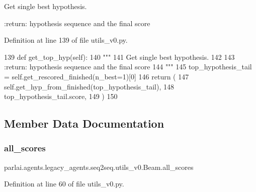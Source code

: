 \begin{DoxyVerb}Get single best hypothesis.

:return: hypothesis sequence and the final score
\end{DoxyVerb}
 

Definition at line 139 of file utils\+\_\+v0.\+py.


\begin{DoxyCode}
139     \textcolor{keyword}{def }get\_top\_hyp(self):
140         \textcolor{stringliteral}{"""}
141 \textcolor{stringliteral}{        Get single best hypothesis.}
142 \textcolor{stringliteral}{}
143 \textcolor{stringliteral}{        :return: hypothesis sequence and the final score}
144 \textcolor{stringliteral}{        """}
145         top\_hypothesis\_tail = self.get\_rescored\_finished(n\_best=1)[0]
146         \textcolor{keywordflow}{return} (
147             self.get\_hyp\_from\_finished(top\_hypothesis\_tail),
148             top\_hypothesis\_tail.score,
149         )
150 
\end{DoxyCode}


\subsection{Member Data Documentation}
\mbox{\label{classparlai_1_1agents_1_1legacy__agents_1_1seq2seq_1_1utils__v0_1_1Beam_ae8e9fc9a712aef34dc78d40faf089d79}} 
\subsubsection{\texorpdfstring{all\+\_\+scores}{all\_scores}}
{\footnotesize\ttfamily parlai.\+agents.\+legacy\+\_\+agents.\+seq2seq.\+utils\+\_\+v0.\+Beam.\+all\+\_\+scores}



Definition at line 60 of file utils\+\_\+v0.\+py.

\mbox{\label{classparlai_1_1agents_1_1legacy__agents_1_1seq2seq_1_1utils__v0_1_1Beam_aa23d688e6e9c2d6ced98d57ac1a7059c}} 
